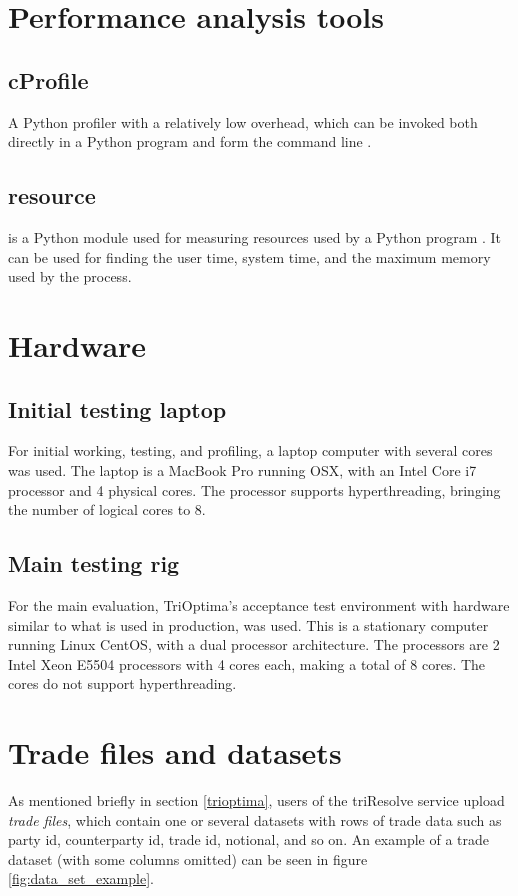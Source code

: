 \section{Performance analysis tools}
\subsection{cProfile}
A Python profiler with a relatively low overhead, which can be invoked both directly in a Python program and form the command line \cite{26_2tppp2d}.

\subsection{resource}
 is a Python module used for measuring resources used by a Python program \cite{36_3rruip2d}. It can be used for finding the user time, system time,
and the maximum memory used by the process.

\section{Hardware}
\subsection{Initial testing laptop}
For initial working, testing, and profiling, a laptop computer with several cores was used. The laptop is a MacBook Pro running OSX, with an Intel Core i7 processor and 4 physical cores.
The processor supports hyperthreading, bringing the number of logical cores to 8.

\subsection{Main testing rig}
For the main evaluation, TriOptima’s acceptance test environment with hardware similar to what is used in production, was used. This is a stationary computer running Linux CentOS,
with a dual processor architecture. The processors are 2 Intel Xeon E5504 processors with 4 cores each, making a total of 8 cores. The cores do not support hyperthreading.

\section{Trade files and datasets}
As mentioned briefly in section \ref{trioptima}, users of the triResolve service upload \textit{trade files}, which contain one or several datasets with
rows of trade data such as party id, counterparty id, trade id, notional, and so on. An example of a trade dataset (with some columns omitted) can be seen in figure
\ref{fig:data_set_example}.

